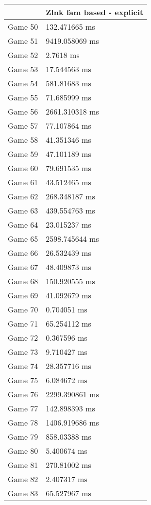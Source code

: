 \begin{tabular}{|l|l|}
	\hline
	& Zlnk fam based - explicit \\ \hline
	Game 50 & 132.471665 ms \\ \hline
	Game 51 & 9419.058069 ms \\ \hline
	Game 52 & 2.7618 ms \\ \hline
	Game 53 & 17.544563 ms \\ \hline
	Game 54 & 581.81683 ms \\ \hline
	Game 55 & 71.685999 ms \\ \hline
	Game 56 & 2661.310318 ms \\ \hline
	Game 57 & 77.107864 ms \\ \hline
	Game 58 & 41.351346 ms \\ \hline
	Game 59 & 47.101189 ms \\ \hline
	Game 60 & 79.691535 ms \\ \hline
	Game 61 & 43.512465 ms \\ \hline
	Game 62 & 268.348187 ms \\ \hline
	Game 63 & 439.554763 ms \\ \hline
	Game 64 & 23.015237 ms \\ \hline
	Game 65 & 2598.745644 ms \\ \hline
	Game 66 & 26.532439 ms \\ \hline
	Game 67 & 48.409873 ms \\ \hline
	Game 68 & 150.920555 ms \\ \hline
	Game 69 & 41.092679 ms \\ \hline
	Game 70 & 0.704051 ms \\ \hline
	Game 71 & 65.254112 ms \\ \hline
	Game 72 & 0.367596 ms \\ \hline
	Game 73 & 9.710427 ms \\ \hline
	Game 74 & 28.357716 ms \\ \hline
	Game 75 & 6.084672 ms \\ \hline
	Game 76 & 2299.390861 ms \\ \hline
	Game 77 & 142.898393 ms \\ \hline
	Game 78 & 1406.919686 ms \\ \hline
	Game 79 & 858.03388 ms \\ \hline
	Game 80 & 5.400674 ms \\ \hline
	Game 81 & 270.81002 ms \\ \hline
	Game 82 & 2.407317 ms \\ \hline
	Game 83 & 65.527967 ms \\ \hline

\end{tabular}
